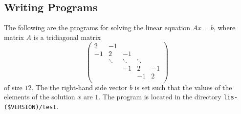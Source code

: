 \documentclass[a4paper]{article}
\begin{document}
\subsection{Writing Programs}
\label{sec:testprog3}
The following are the programs for solving the linear equation $Ax = b$,
where matrix $A$ is a tridiagonal matrix 
\[
\left(
\begin{array}{ccccc}
2 & -1 &   &  &   \\
-1 & 2 & -1 &  &   \\
  & \ddots  & \ddots  & \ddots  &   \\
  &   & -1 & 2 & -1 \\
  &   &   & -1 & 2 \\
\end{array}
\right)
\]
of size $12$.
The the right-hand side vector $b$ is set such that the values of the elements of the solution $x$ are $1$. 
The program is located in the directory \verb|lis-($VERSION)/test|. 
\end{document}
